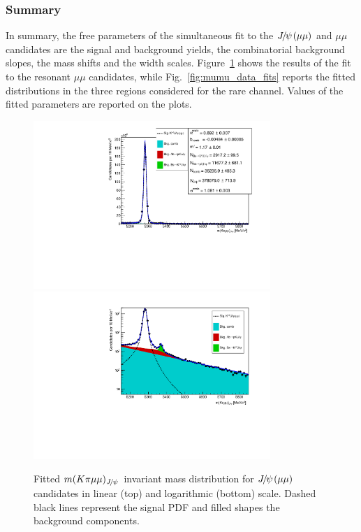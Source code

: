 \subsubsection{Summary}

In summary, the free parameters of the simultaneous fit to the $\jpsi(\mu\mu)$ and 
$\mu\mu$ candidates are the signal and background yields, the combinatorial background 
slopes, the mass shifts and the width scales. Figure~\ref{fig:mumu_data_jpsi_fits} shows the results 
of the fit to the resonant $\mu\mu$ candidates, while Fig.~\ref{fig:mumu_data_fits} reports the 
fitted distributions in the three \qsq regions considered for the rare channel. 
Values of the fitted parameters are reported on the plots.

\begin{figure}[h!]
\centering
\includegraphics[width=0.8\textwidth]{RKst/figs/Fit/fit_MM/KstJPsMM.pdf}
\includegraphics[width=0.8\textwidth]{RKst/figs/Fit/fit_MM/KstJPsMM_log.pdf}
\caption{Fitted $m(K\pi \mu\mu)_\jpsi$ invariant mass distribution for $\jpsi(\mu\mu)$ candidates
in linear (top) and logarithmic (bottom) scale. Dashed black lines represent the signal 
PDF and filled shapes the background components. }
\label{fig:mumu_data_jpsi_fits}
\end{figure}
